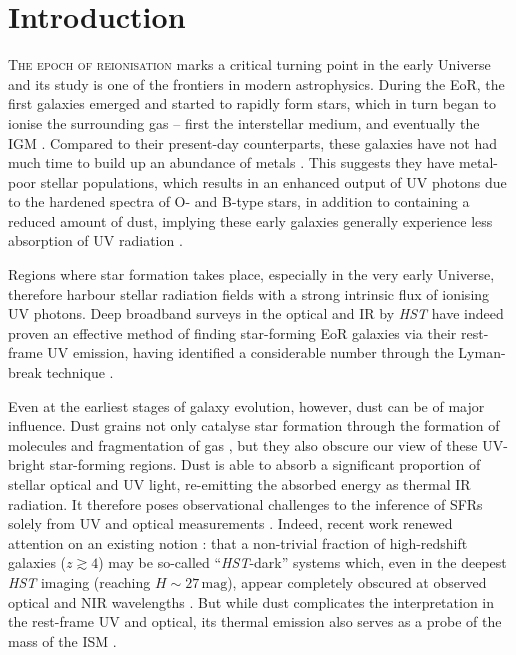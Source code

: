\section{Introduction}
\label{chDsec:Introduction}

\lettrine{T}{he epoch of reionisation} marks a critical turning point in the early Universe and its study is one of the frontiers in modern astrophysics. During the EoR, the first galaxies emerged and started to rapidly form stars, which in turn began to ionise the surrounding gas -- first the interstellar medium, and eventually the IGM \citep{2018PhR...780....1D, 2021arXiv211013160R}. Compared to their present-day counterparts, these galaxies have not had much time to build up an abundance of metals . This suggests they have metal-poor stellar populations, which results in an enhanced output of UV photons due to the hardened spectra of O- and B-type stars, in addition to containing a reduced amount of dust, implying these early galaxies generally experience less absorption of UV radiation \citep{2016ARA&A..54..761S}.

Regions where star formation takes place, especially in the very early Universe, therefore harbour stellar radiation fields with a strong intrinsic flux of ionising UV photons. Deep broadband surveys in the optical and IR by \textit{HST} have indeed proven an effective method of finding star-forming EoR galaxies via their rest-frame UV emission, having identified a considerable number through the Lyman-break technique \citep[currently nearly \num{2000} candidates at $z \geq 6$; see e.g.][]{2021AJ....162...47B}.

Even at the earliest stages of galaxy evolution, however, dust can be of major influence. Dust grains not only catalyse star formation through the formation of molecules \citep{2018MNRAS.474.1545C} and fragmentation of gas \citep{2006MNRAS.369.1437S}, but they also obscure our view of these UV-bright star-forming regions. Dust is able to absorb a significant proportion of stellar optical and UV light, re-emitting the absorbed energy as thermal IR radiation. It therefore poses observational challenges to the inference of SFRs solely from UV and optical measurements \citep{2012ARA&A..50..531K, 2014ARA&A..52..415M, 2020ApJ...902..112B}. Indeed, recent work renewed attention on an existing notion \citep{2020RSOS....700556H}: that a non-trivial fraction of high-redshift galaxies ($z \gtrsim 4$) may be so-called ``\textit{HST}-dark'' systems which, even in the deepest \textit{HST} imaging (reaching $H \sim 27 \, \mathrm{mag}$), appear completely obscured at observed optical and NIR wavelengths \citep{2018A&A...620A.152F, 2019ApJ...884..154W, 2019Natur.572..211W, 2021Natur.597..489F, 2021ApJ...923..215C, 2022ApJ...925...23M}. But while dust complicates the interpretation in the rest-frame UV and optical, its thermal emission also serves as a probe of the mass of the ISM \citep[e.g.][]{2017ApJ...837..150S}.

